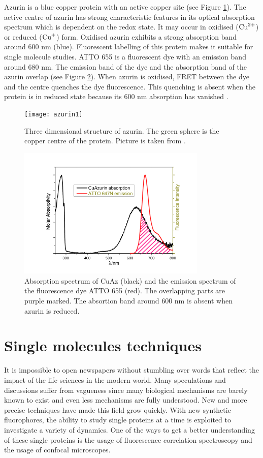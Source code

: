 \documentclass[twoside,single]{lion-msc}
\begin{document}
Azurin is a blue copper protein with an active copper site (see Figure \ref{azurin}). The active centre of azurin has strong characteristic features in its optical absorption spectrum which is dependent on the redox state. It may occur in oxidised ($\textup{Cu}^{2+}$) or reduced ($\textup{Cu}^{+}$) form. Oxidised azurin exhibits a strong absorption band around 600 nm (blue). Fluorescent labelling of this protein makes it suitable for single molecule studies. ATTO 655 is a fluorescent dye with an emission band around 680 nm. The emission band of the dye and the absorption band of the azurin overlap (see Figure \ref{absorption}). When azurin is oxidised, FRET between the dye and the centre quenches the dye fluorescence. This quenching is absent when the protein is in reduced state because its 600 nm absorption has vanished \cite{Tabares2014}.

\begin{figure}[ht!]
\centering
\texttt{[image: azurin1]}
\caption{Three dimensional structure of azurin. The green sphere is the copper centre of the protein. Picture is taken from \cite{BORMAN2010}.} 
\label{azurin}
\end{figure}

\begin{figure}[ht!]
\centering
\includegraphics[width=90mm]{absorp.pdf}
\caption{Absorption spectrum of CuAz (black) and the emission spectrum of the fluorescence dye ATTO 655 (red). The overlapping parts are purple marked. The absortion band around 600 nm is absent when azurin is reduced.} 
\label{absorption}
\end{figure}


\section{Single molecules techniques}
It is impossible to open newspapers without stumbling over words that reflect the impact of the life sciences in the modern world. Many speculations and discussions suffer from vagueness since many biological mechanisms are barely known to exist and even less mechanisms are fully understood. New and more precise techniques have made this field grow quickly. With new synthetic fluorophores, the ability to study single proteins at a time is exploited to investigate a variety of dynamics.  One of the ways to get a better understanding of these single proteins is the usage of fluorescence correlation spectroscopy and the usage of confocal microscopes. 
\end{document}
